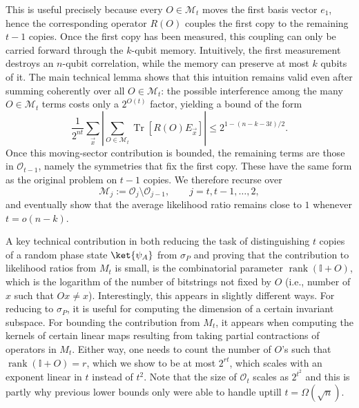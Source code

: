 \documentclass[11pt]{article}
\newcommand{\id}{\ensuremath{\mathbb{I}}}
\newcommand{\Oc}{\mathcal{O}}
\DeclareMathOperator{\rank}{rank}
\begin{document}
This is useful precisely because every $O\in\mathcal M_t$ moves the first basis vector $e_1$, hence the corresponding operator $R(O)$ couples the first copy to the remaining $t-1$ copies. Once the first copy has been measured, this coupling can only be carried forward through the $k$-qubit memory. Intuitively, the first measurement destroys an $n$-qubit correlation, while the memory can preserve at most $k$ qubits of it. The main technical lemma shows that this intuition remains valid even after summing coherently over all $O\in\mathcal M_t$: the possible interference among the many $O \in \mathcal M_t$ terms costs only a $2^{O(t)}$ factor, yielding a bound of the form
$$
\frac{1}{2^{nt}}\sum_{\vec x}
\left|
\sum_{O\in\mathcal M_t}\operatorname{Tr}[R(O)E_{\vec x}]
\right|
\leq
2^{1-(n-k-3t)/2}.
$$
Once this moving-sector contribution is bounded, the remaining terms are those in $\mathcal O_{t-1}$, namely the symmetries that fix the first copy. These have the same form as the original problem on $t-1$ copies. We therefore recurse over
$$
\mathcal M_j:=\mathcal O_j\setminus \mathcal O_{j-1},
\qquad j=t,t-1,\ldots,2,
$$
and eventually show that the average likelihood ratio remains close to $1$ whenever $t=o(n-k)$.

A key technical contribution in both reducing the task of distinguishing $t$ copies of a random phase state $\ket{\psi_A}$ from $\sigma_P$ and proving that the contribution to likelihood ratios from $M_{t}$ is small, is the combinatorial parameter $\rank(\id+O)$, which is the logarithm of the number of bitstrings not fixed by $O$ (i.e., number of $x$ such that $Ox \neq x$). Interestingly, this appears in slightly different ways. For reducing to $\sigma_P$, it is useful for computing the dimension of a certain invariant subspace. For bounding the contribution from $M_t$, it appears when computing the kernels of certain linear maps resulting from taking partial contractions of operators in $M_t$. Either way, one needs to count the number of $O$'s such that $\rank(\id+O) = r$, which we show to be at most $2^{rt}$, which scales with an exponent linear in $t$ instead of $t^2$. Note that the size of $\Oc_t$ scales as $2^{t^2}$ and this is partly why previous lower bounds only were able to handle uptill $t = \Omega(\sqrt{n})$. 
\end{document}
